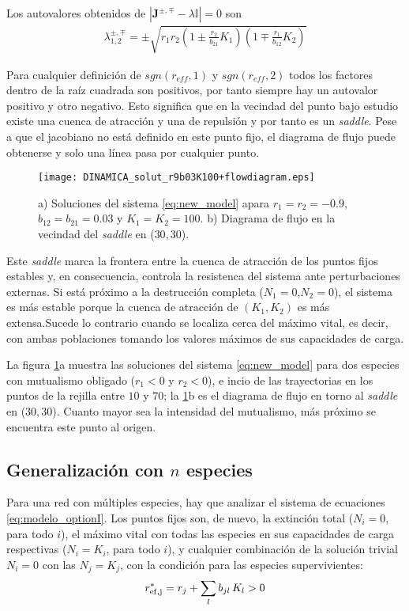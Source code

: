 Los autovalores obtenidos de $\left| \mathbf{J}^{\pm,\mp}-\lambda\mathbb{I}  \right|=0$ son
\begin{align*}
  \lambda^{\pm,\mp}_{1,2}= \pm \sqrt{r_1 r_2 \left(1\pm\frac{r_2}{b_{21}}K_1 \right)\left(1\mp\frac{r_1}{b_{12}}K_2 \right)}
\end{align*}

Para cualquier definición de $sgn(r_{eff},1)$ y $sgn(r_{eff},2)$ todos los factores dentro de la raíz cuadrada son positivos, por tanto siempre hay un autovalor positivo y otro negativo. Esto significa que en la vecindad del punto bajo estudio existe una cuenca de atracción y una de repulsión y por tanto es un \textit{saddle}. Pese a que el jacobiano no está definido en este punto fijo, el diagrama de flujo puede obtenerse y solo una línea pasa por cualquier punto.

\begin{figure}[h!]
\centering
\texttt{[image: DINAMICA\_solut\_r9b03K100+flowdiagram.eps]}
\caption {a) Soluciones del sistema \ref{eq:new_model} apara $r_1=r_2=-0.9$, $b_{12}=b_{21}=0.03$ y $K_1=K_2=100$. b) Diagrama de flujo en la vecindad del \textit{saddle} en ($30,30$).}
\label{fig:stab1_phase}
\end{figure}

Este \textit{saddle} marca la frontera entre la cuenca de atracción de los puntos fijos estables y, en consecuencia, controla la resistenca del sistema ante perturbaciones externas. Si está próximo a la destrucción completa ($N_1=0$,$N_2=0$), el sistema es más estable porque la cuenca de atracción de $(K_1,K_2)$ es más extensa.Sucede lo contrario cuando se localiza cerca del máximo vital, es decir, con ambas poblaciones tomando los valores máximos de sus capacidades de carga.

La figura \ref{fig:stab1_phase}a muestra las soluciones del sistema \ref{eq:new_model} para dos especies con mutualismo obligado ($r_1<0$ y $r_2<0$), e incio de las trayectorias en los puntos de la rejilla entre $10$ y $70$; la \ref{fig:stab1_phase}b es el diagrama de flujo en torno al \textit{saddle} en ($30,30$). Cuanto mayor sea la intensidad del mutualismo, más próximo se encuentra este punto al origen.


\subsection{Generalización con $n$ especies}

Para una red con múltiples especies, hay que analizar el sistema de ecuaciones \ref{eq:modelo_optionI}. Los puntos fijos son, de nuevo, la extinción total ($N_i=0$, para todo $i$), el máximo vital con todas las especies en sus capacidades de carga respectivas ($N_i=K_i$, para todo $i$), y cualquier combinación de la solución trivial $N_{i}=0$ con las $N_{j}= K_{j}$, con la condición para las especies supervivientes:
\begin{equation}
\displaystyle r_{\rm{ef},j}^{\ast} = r_{j} + \sum_{l} b_{jl}\, K_{l} > 0 \\
\label{eq:condit_reff_K}
\end{equation}

